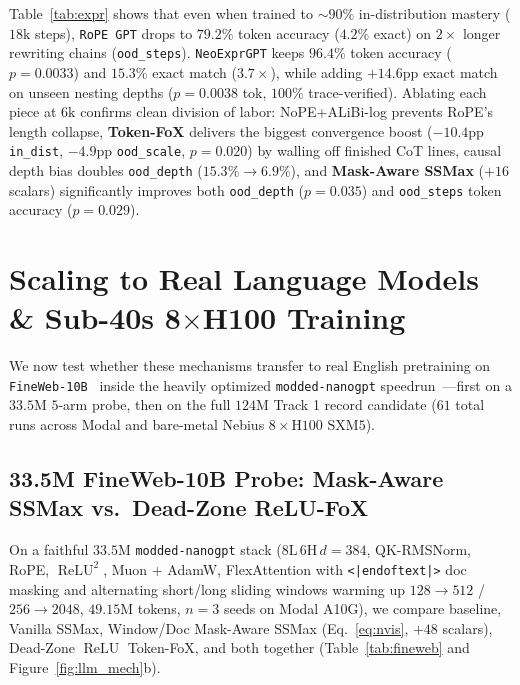 \documentclass[10pt]{article}
\begin{document}
Table~\ref{tab:expr} shows that even when trained to $\sim 90\%$ in-distribution mastery ($18\text{k}$ steps), \texttt{RoPE GPT} drops to $79.2\%$ token accuracy ($4.2\%$ exact) on $2\times$ longer rewriting chains (\texttt{ood\_steps}). \texttt{NeoExprGPT} keeps $96.4\%$ token accuracy ($p=0.0033$) and $15.3\%$ exact match ($3.7\times$), while adding $+14.6\text{pp}$ exact match on unseen nesting depths ($p=0.0038$ tok, $100\%$ trace-verified). Ablating each piece at $6\text{k}$ confirms clean division of labor: NoPE+ALiBi-log prevents RoPE's length collapse, \textbf{Token-FoX} delivers the biggest convergence boost ($-10.4\text{pp}$ \texttt{in\_dist}, $-4.9\text{pp}$ \texttt{ood\_scale}, $p=0.020$) by walling off finished CoT lines, causal depth bias doubles \texttt{ood\_depth} ($15.3\% \to 6.9\%$), and \textbf{Mask-Aware SSMax} ($+16$ scalars) significantly improves both \texttt{ood\_depth} ($p=0.035$) and \texttt{ood\_steps} token accuracy ($p=0.029$).

\section{Scaling to Real Language Models \& Sub-40s \texorpdfstring{8$\times$H100}{8xH100} Training}
\label{sec:llm}

We now test whether these mechanisms transfer to real English pretraining on \texttt{FineWeb-10B}~\cite{penedo2024} inside the heavily optimized \texttt{modded-nanogpt} speedrun~\cite{jordan2024}---first on a $33.5\text{M}$ $5$-arm probe, then on the full $124\text{M}$ Track 1 record candidate ($61$ total runs across Modal and bare-metal Nebius $8\times\text{H100 SXM5}$).

\subsection{33.5M FineWeb-10B Probe: Mask-Aware SSMax vs.\ Dead-Zone ReLU-FoX}
\label{sec:fineweb}

On a faithful $33.5\text{M}$ \texttt{modded-nanogpt} stack ($8\text{L}\,6\text{H}\,d=384$, QK-RMSNorm, RoPE, $\operatorname{ReLU}^2$, Muon + AdamW, FlexAttention with \texttt{<|endoftext|>} doc masking and alternating short/long sliding windows warming up $128\to 512$ / $256\to 2048$, $49.15\text{M}$ tokens, $n=3$ seeds on Modal A10G), we compare baseline, Vanilla SSMax, Window/Doc Mask-Aware SSMax (Eq.~\ref{eq:nvis}, $+48$ scalars), Dead-Zone $\operatorname{ReLU}$ Token-FoX, and both together (Table~\ref{tab:fineweb} and Figure~\ref{fig:llm_mech}b).
\end{document}
